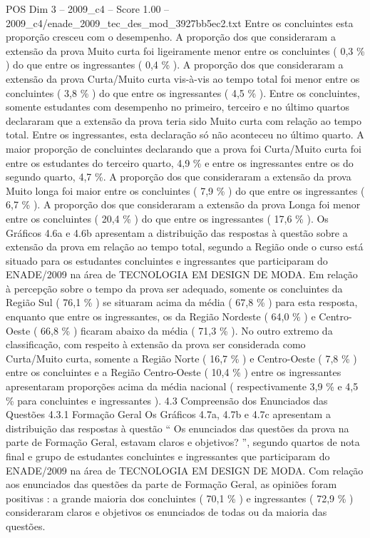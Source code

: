 \begin{textsample}{POS Dim 3 – 2009\_c4 – Score 1.00 – 2009\_c4/enade\_2009\_tec\_des\_mod\_3927bb5ec2.txt}
Entre os concluintes esta proporção cresceu com o desempenho.
A proporção dos que consideraram a extensão da prova Muito curta foi ligeiramente menor entre os concluintes ( 0,3 \% ) do que entre os ingressantes ( 0,4 \% ).
A proporção dos que consideraram a extensão da prova Curta/Muito curta vis-à-vis ao tempo total foi menor entre os concluintes ( 3,8 \% ) do que entre os ingressantes ( 4,5 \% ).
Entre os concluintes, somente estudantes com desempenho no primeiro, terceiro e no último quartos declararam que a extensão da prova teria sido Muito curta com relação ao tempo total.
Entre os ingressantes, esta declaração só não aconteceu no último quarto.
A maior proporção de concluintes declarando que a prova foi Curta/Muito curta foi entre os estudantes do terceiro quarto, 4,9 \% e entre os ingressantes entre os do segundo quarto, 4,7 \%.
A proporção dos que consideraram a extensão da prova Muito longa foi maior entre os concluintes ( 7,9 \% ) do que entre os ingressantes ( 6,7 \% ).
A proporção dos que consideraram a extensão da prova Longa foi menor entre os concluintes ( 20,4 \% ) do que entre os ingressantes ( 17,6 \% ).
Os Gráficos 4.6a e 4.6b apresentam a distribuição das respostas à questão sobre a extensão da prova em relação ao tempo total, segundo a Região onde o curso está situado para os estudantes concluintes e ingressantes que participaram do ENADE/2009 na área de TECNOLOGIA EM DESIGN DE MODA.
Em relação à percepção sobre o tempo da prova ser adequado, somente os concluintes da Região Sul ( 76,1 \% ) se situaram acima da média ( 67,8 \% ) para esta resposta, enquanto que entre os ingressantes, os da Região Nordeste ( 64,0 \% ) e Centro-Oeste ( 66,8 \% ) ficaram abaixo da média ( 71,3 \% ).
No outro extremo da classificação, com respeito à extensão da prova ser considerada como Curta/Muito curta, somente a Região Norte ( 16,7 \% ) e Centro-Oeste ( 7,8 \% ) entre os concluintes e a Região Centro-Oeste ( 10,4 \% ) entre os ingressantes apresentaram proporções acima da média nacional ( respectivamente 3,9 \% e 4,5 \% para concluintes e ingressantes ). 4.3 Compreensão dos Enunciados das Questões 4.3.1 Formação Geral Os Gráficos 4.7a, 4.7b e 4.7c apresentam a distribuição das respostas à questão “ Os enunciados das questões da prova na parte de Formação Geral, estavam claros e objetivos? ”, segundo quartos de nota final e grupo de estudantes concluintes e ingressantes que participaram do ENADE/2009 na área de TECNOLOGIA EM DESIGN DE MODA.
Com relação aos enunciados das questões da parte de Formação Geral, as opiniões foram positivas : a grande maioria dos concluintes ( 70,1 \% ) e ingressantes ( 72,9 \% ) consideraram claros e objetivos os enunciados de todas ou da maioria das questões.

\end{textsample}
